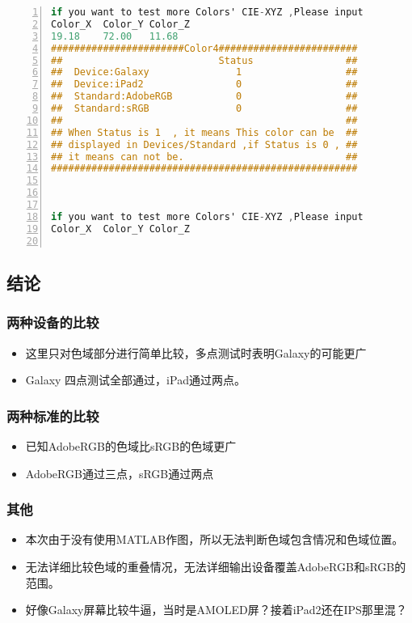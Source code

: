 \documentclass[UTF8]{article}
\begin{document}
\begin{lstlisting}[language=C, label=lst:4coloroutput, caption=Answers, numbers=left, stepnumber=1, frame=leftline , texcl=true, basicstyle=\ttfamily]
if you want to test more Colors' CIE-XYZ ,Please input
Color_X  Color_Y Color_Z
19.18    72.00   11.68
#######################Color4########################
##                           Status                ##
##  Device:Galaxy               1                  ##
##  Device:iPad2                0                  ##
##  Standard:AdobeRGB           0                  ##
##  Standard:sRGB               0                  ##
##                                                 ##
## When Status is 1  , it means This color can be  ##
## displayed in Devices/Standard ,if Status is 0 , ##
## it means can not be.                            ##
#####################################################



if you want to test more Colors' CIE-XYZ ,Please input
Color_X  Color_Y Color_Z


\end{lstlisting}


\subsection{结论}
\subsubsection{两种设备的比较}
\begin{itemize}
\item  这里只对色域部分进行简单比较，多点测试时表明Galaxy的可能更广
\item  Galaxy 四点测试全部通过，iPad通过两点。
\end{itemize}
\subsubsection{两种标准的比较}
\begin{itemize}
\item  已知AdobeRGB的色域比sRGB的色域更广
\item  AdobeRGB通过三点，sRGB通过两点
\end{itemize}
\subsubsection{其他}
\begin{itemize}
\item  本次由于没有使用MATLAB作图，所以无法判断色域包含情况和色域位置。
\item  无法详细比较色域的重叠情况，无法详细输出设备覆盖AdobeRGB和sRGB的范围。
\item  好像Galaxy屏幕比较牛逼，当时是AMOLED屏？接着iPad2还在IPS那里混？
\end{itemize}
\end{document}
